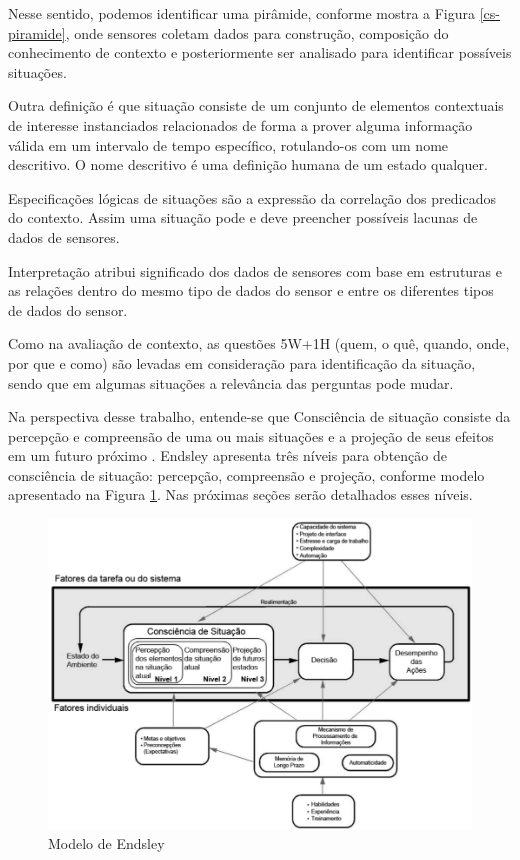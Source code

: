 \documentclass[12pt,a4paper,compsoc]{IEEEtran}
\begin{document}
  Nesse sentido, podemos identificar uma pirâmide, conforme mostra a Figura \ref{cs-piramide},
  onde sensores coletam dados para construção, composição do conhecimento de contexto e
  posteriormente ser analisado para identificar possíveis situações.

  Outra definição é que situação consiste de um conjunto de elementos contextuais de interesse 
  instanciados relacionados de forma a prover alguma informação válida em um intervalo de tempo 
  específico, rotulando-os com um nome descritivo. O nome descritivo é uma definição humana de um 
  estado qualquer.
  
  Especificações lógicas de situações são a expressão da correlação dos predicados do contexto. 
  Assim uma situação pode e deve preencher possíveis lacunas de dados de sensores.
  
  Interpretação atribui significado dos dados de sensores com base em estruturas e as relações 
  dentro do mesmo tipo de dados do sensor e entre os diferentes tipos de dados do sensor.
  
  Como na  avaliação de contexto, as questões 5W+1H (quem, o quê, quando, onde, por que e como) são
  levadas em consideração para identificação da situação, sendo que em algumas situações a 
  relevância das perguntas pode mudar.
  

  Na perspectiva desse trabalho, entende-se que Consciência de situação consiste da percepção e
  compreensão de uma ou mais situações e a projeção de seus efeitos em um futuro próximo 
  \cite{endsley1995}. Endsley apresenta três níveis para obtenção de consciência de situação:
  percepção, compreensão e projeção, conforme modelo apresentado na Figura \ref{modelo-endsley}.
  Nas próximas seções serão detalhados esses níveis.

  \begin{figure}[ht]
    \centerline{\includegraphics[scale=.35]{imagens/modelo-endsley.png}}
    \caption{Modelo de Endsley \cite{endsley1995}}
    \label{modelo-endsley}
  \end{figure}
\end{document}
